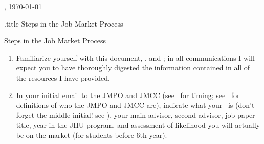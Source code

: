 \documentclass{econtex}
\begin{document}
\hfill{\tiny \jobname, \today} \vspace{0.1in}

\begin{verbatimwrite}{\jobname.title}
Steps in the Job Market Process
\end{verbatimwrite}
\ifdvi\large\fi
\centerline{\Large Steps in the Job Market Process}\medskip\medskip

\begin{enumerate}
\item Familiarize yourself with this document, \timet, and \faq; in all communications I will expect you
  to have thoroughly digested the information contained in all of the resources
  I have provided.

\item In your initial email to the JMPO and JMCC (see
  \timet~for timing; see \ntn~for definitions of who the JMPO and JMCC are), indicate what your \Moniker~is (don't forget the middle initial!  see \Notation), your main advisor, second advisor, job paper title,
  year in the JHU program, and assessment of likelihood you will
  actually be on the market (for students before 6th year).


\end{enumerate}
\end{document}
